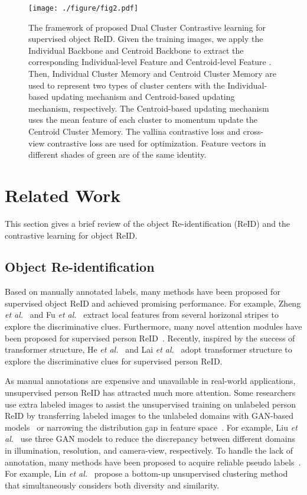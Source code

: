 \documentclass[10pt,twocolumn,letterpaper]{article}
\begin{document}
\begin{figure*}
  \centering
   \texttt{[image: ./figure/fig2.pdf]}
   \caption{\small The framework of proposed Dual Cluster Contrastive learning for supervised object ReID. Given the training images, we apply the Individual Backbone and Centroid Backbone to extract the corresponding Individual-level Feature  and Centroid-level Feature . Then, Individual Cluster Memory  and Centroid Cluster Memory  are used to represent two types of cluster centers with the Individual-based updating mechanism and Centroid-based updating mechanism, respectively. The Centroid-based updating mechanism uses the mean feature of each cluster to momentum update the Centroid Cluster Memory. The vallina contrastive loss and cross-view contrastive loss are used for optimization. Feature vectors in different shades of green are of the same identity.}
   \label{fig2}
\end{figure*}

\section{Related Work}\label{sec:rela}
This section gives a brief review of the object Re-identification (ReID) and the contrastive learning for object ReID.
\subsection{Object Re-identification}
Based on manually annotated labels, many methods have been proposed for supervised object ReID and achieved promising performance.
For example, Zheng \textit{et al.}~\cite{zheng2019pyramidal} and Fu \textit{et al.}~\cite{fu2019self} extract local features from several horizonal stripes to explore the discriminative clues. 
Furthermore, many novel attention modules have been proposed for supervised person ReID~\cite{Zhang_2020_CVPR, Chen_2021_ICCV, zhang2021person, xia2019second, chen2019mixed}. 
Recently, inspired by the success of transformer structure, He \textit{et al.}~\cite{He_2021_ICCV} and Lai \textit{et al.}~\cite{Lai_2021_ICCV} adopt transformer structure to explore the discriminative clues for supervised person ReID.

As manual annotations are expensive and unavailable in real-world applications, unsupervised person ReID has attracted much more attention. 
Some researchers use extra labeled images to assist the unsupervised training on unlabeled person ReID by transferring labeled images to the unlabeled domains with GAN-based models~\cite{Chen_2019_ICCV, wei2018person, Liu_2019_CVPR, zhong2018generalizing} or narrowing the distribution gap in feature space~\cite{liu2020domain, Huang2020aaai, dai2021idm}. 
For example, Liu \textit{et al.}~\cite{Liu_2019_CVPR} use three GAN models to reduce the discrepancy between different domains in illumination, resolution, and camera-view, respectively.
To handle the lack of annotation, many methods have been proposed to acquire reliable pseudo labels~\cite{yu2019unsupervised, zeng2020hierarchical,  lin2019bottom, ding2019towards, zheng2021group}. For example, Lin \textit{et al.}~\cite{lin2019bottom} propose a bottom-up unsupervised clustering method that simultaneously considers both diversity and similarity.
\end{document}
